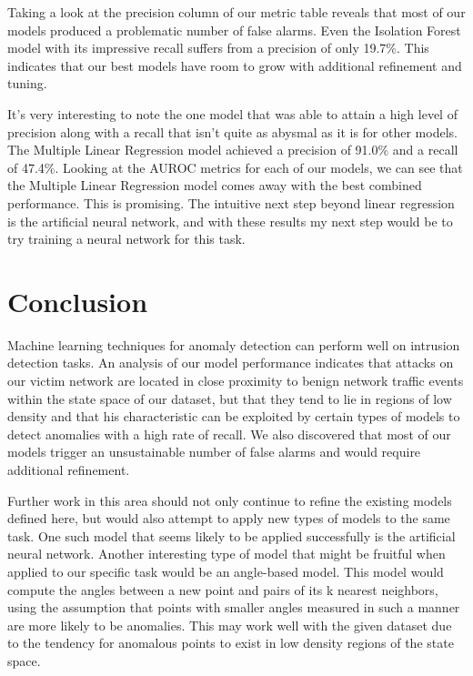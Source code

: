 \documentclass[conference]{IEEEtran}
\begin{document}
Taking a look at the precision column of our metric table reveals that most of our models produced a problematic number of false alarms. Even the Isolation Forest model with its impressive recall suffers from a precision of only 19.7\%. This indicates that our best models have room to grow with additional refinement and tuning.

It's very interesting to note the one model that was able to attain a high level of precision along with a recall that isn't quite as abysmal as it is for other models. The Multiple Linear Regression model achieved a precision of 91.0\% and a recall of 47.4\%. Looking at the AUROC metrics for each of our models, we can see that the Multiple Linear Regression model comes away with the best combined performance. This is promising. The intuitive next step beyond linear regression is the artificial neural network, and with these results my next step would be to try training a neural network for this task.

\section{Conclusion}

Machine learning techniques for anomaly detection can perform well on intrusion detection tasks. An analysis of our model performance indicates that attacks on our victim network are located in close proximity to benign network traffic events within the state space of our dataset, but that they tend to lie in regions of low density and that his characteristic can be exploited by certain types of models to detect anomalies with a high rate of recall. We also discovered that most of our models trigger an unsustainable number of false alarms and would require additional refinement.

Further work in this area should not only continue to refine the existing models defined here, but would also attempt to apply new types of models to the same task. One such model that seems likely to be applied successfully is the artificial neural network. Another interesting type of model that might be fruitful when applied to our specific task would be an angle-based model. This model would compute the angles between a new point and pairs of its k nearest neighbors, using the assumption that points with smaller angles measured in such a manner are more likely to be anomalies. This may work well with the given dataset due to the tendency for anomalous points to exist in low density regions of the state space.
\end{document}

